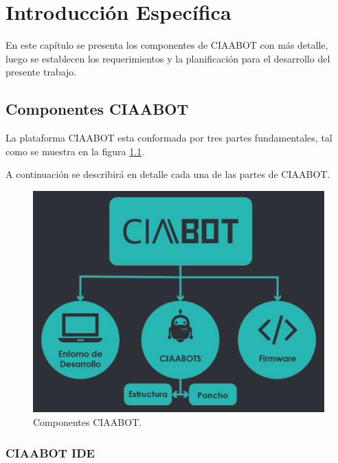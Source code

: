 \chapter{Introducción Específica} %

\label{Chapter2}

En este capítulo se presenta los componentes de CIAABOT con más detalle, luego se establecen los requerimientos y
la planificación para el desarrollo del presente trabajo.

\section{Componentes CIAABOT}
\label{sec:Componentes CIAABOT}
La plataforma CIAABOT esta conformada por tres partes fundamentales, tal como se muestra en la figura \ref{fig:componentesCiaabot}. 

A continuación se describirá en detalle cada una de las partes de CIAABOT.

\begin{figure}[h]
	\centering
	\includegraphics[scale=.50]{./Figures/componentesCiabot.png}
	\caption{Componentes CIAABOT.}
	\label{fig:componentesCiaabot}
\end{figure}

\subsection{CIAABOT IDE}

